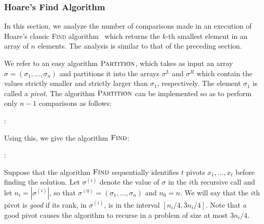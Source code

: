 \documentclass{patmorin}
\begin{document}
\subsubsection{Hoare's Find Algorithm}

In this section, we analyze the number of comparisons made in an
execution of Hoare's classic \textsc{Find} algorithm~\cite{hoare:find}
which returns the $k$-th smallest element in an array of $n$
elements. The analysis is similar to that of the preceding section.

We refer to an easy algorithm $\textsc{Partition}$, which takes as
input an array $\sigma = (\sigma_1, \dots, \sigma_n)$ and partitions
it into the arrays $\sigma^L$ and $\sigma^R$ which contain the values
strictly smaller and strictly larger than $\sigma_1$,
respectively. The element $\sigma_1$ is called a \emph{pivot}. The
algorithm $\textsc{Partition}$ can be implemented so as to perform
only $n - 1$ comparisons as follows:

:
\begin{algorithmic}[1]
    \ELSE
    \ENDIF
  \ENDFOR
\end{algorithmic}

Using this, we give the algorithm $\textsc{Find}$:

:
\begin{algorithmic}[1]
  \ENDIF
\end{algorithmic}

Suppose that the algorithm $\textsc{Find}$ sequentially identifies $t$
pivots $x_1, \dots, x_t$ before finding the solution. Let
$\sigma^{(i)}$ denote the value of $\sigma$ in the $i{\text{th}}$
recursive call and let $n_i=|\sigma^{(i)}|$, so that
$\sigma^{(0)}=(\sigma_1,\ldots,\sigma_n)$ and $n_0=n$.  We will say
that the $i{\text{th}}$ pivot is \emph{good} if its rank, in
$\sigma^{(i)}$, is in the interval $[n_i/4, 3n_i/4]$. Note that a good
pivot causes the algorithm to recurse in a problem of size at most
$3n_i/4$.
\end{document}

